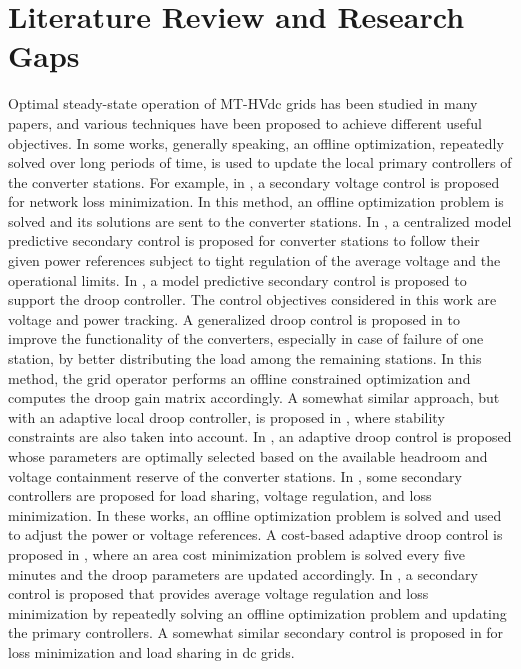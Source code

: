 \section{Literature Review and Research Gaps}
Optimal steady-state operation of MT-HVdc grids has been studied in many papers, and various techniques have been proposed to achieve different useful objectives.
In some works, generally speaking, an offline optimization, repeatedly solved over long periods of time, is used to update the local primary controllers of the converter stations.
For example, in \cite{Gavriluta2015}, a secondary voltage control is proposed for network loss minimization. In this method, an offline optimization problem is solved and its solutions are sent to the converter stations.
In \cite{Papangelis2017}, a centralized model predictive secondary control is proposed for converter stations to follow their given power references subject to tight regulation of the average voltage and the operational limits.
In \cite{CarmonSanchez2020}, a model predictive secondary control is proposed to support the droop controller. The control objectives considered in this work are voltage and power tracking.
A generalized droop control is proposed in \cite{Eriksson2018} to improve the functionality of the converters, especially in case of failure of one station, by better distributing the load among the remaining stations. In this method, the grid operator performs an offline constrained optimization and computes the droop gain matrix accordingly. A somewhat similar approach, but with an adaptive local droop controller, is proposed in \cite{Yogarathinam2019}, where stability constraints are also taken into account.
In \cite{Shinoda2022}, an adaptive droop control is proposed whose parameters are optimally selected based on the available headroom and voltage containment reserve of the converter stations.
In \cite{Zhang2021,Zhang2022}, some secondary controllers are proposed for load sharing, voltage regulation, and loss minimization. In these works, an offline optimization problem is solved and used to adjust the power or voltage references.
A cost-based adaptive droop control is proposed in \cite{Song2021}, where an area cost minimization problem is solved every five minutes and the droop parameters are updated accordingly.
In \cite{Xie2023}, a secondary control is proposed that provides average voltage regulation and loss minimization by repeatedly solving an offline optimization problem and updating the primary controllers.
A somewhat similar secondary control is proposed in \cite{Li2018} for loss minimization and load sharing in dc grids.

